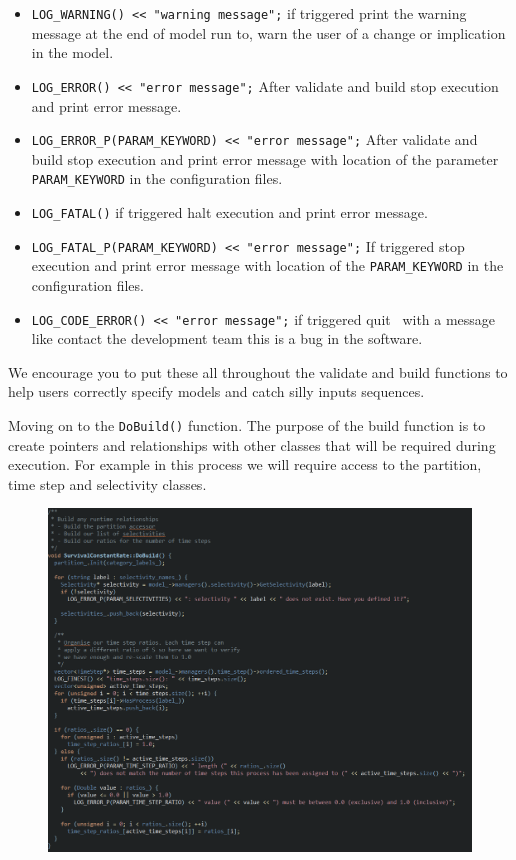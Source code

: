 \begin{itemize}
	\item \texttt{LOG\_WARNING() << "warning message";} if triggered print the warning message at the end of model run to, warn the user of a change or implication in the model.
	\item \texttt{LOG\_ERROR() << "error message";} After validate and build stop execution and print error message.
	\item \texttt{LOG\_ERROR\_P(PARAM\_KEYWORD) << "error message";} After validate and build stop execution and print error message with location of the parameter \texttt{PARAM\_KEYWORD} in the configuration files.
	\item \texttt{LOG\_FATAL()} if triggered halt execution and print error message.
	\item \texttt{LOG\_FATAL\_P(PARAM\_KEYWORD) << "error message";} If triggered stop execution and print error message with location of the \texttt{PARAM\_KEYWORD} in the configuration files.		
	\item \texttt{LOG\_CODE\_ERROR() << "error message";} if triggered quit \CNAME\ with a message like contact the development team this is a bug in the software.	
\end{itemize}

We encourage you to put these all throughout the validate and build functions to help users correctly specify models and catch silly inputs sequences.


Moving on to the \texttt{DoBuild()} function. The purpose of the build function is to create pointers and relationships with other classes that will be required during execution. For example in this process we will require access to the partition, time step and selectivity classes.

\begin{figure}[!ht]
	\centering
	\includegraphics[scale=0.7]{Figures/build.png}
	\caption{}\label{fig:build}
\end{figure}


